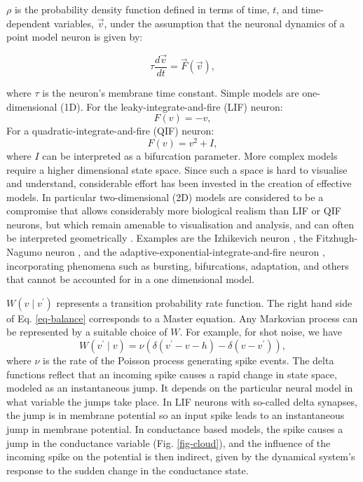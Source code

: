 \documentclass[utf8]{frontiersSCNS} %
\begin{document}
$\rho$ is the probability density function defined in terms of time, $t$, and time-dependent variables, $\vec{v}$, under the assumption that the neuronal dynamics of a point model neuron is given by:

\begin{equation}
\tau \frac{ d \vec{v}}{dt} = \vec{F}(\vec{v}), 
\end{equation}

where $\tau$ is the neuron's membrane time constant. Simple models are one-dimensional (1D). 
For the leaky-integrate-and-fire (LIF) neuron: 
\begin{equation}
F(v) = -v,
\end{equation}  
For a quadratic-integrate-and-fire (QIF) neuron:
\begin{equation}
F(v)= v^2 + I,
\end{equation}  
where $I$ can be interpreted as a bifurcation parameter. More complex models require a higher dimensional state space. Since such a space is hard to visualise and understand, considerable effort has been invested in the creation of effective models. In particular two-dimensional (2D) models are considered to be a compromise that allows considerably more biological realism than LIF or QIF neurons, but which remain amenable to visualisation and analysis, and can often be interpreted geometrically \citep{izhikevich2007dynamical}. Examples are the Izhikevich neuron \citep{izhikevich2003simple}, the Fitzhugh-Nagumo neuron \citep{fitzhugh1961impulses,nagumo1962active}, and the adaptive-exponential-integrate-and-fire neuron \citep{brette2005}, incorporating phenomena such as bursting, bifurcations, adaptation, and others that cannot be accounted for in a one dimensional model.

$W(v \mid v^{\prime})$ represents a transition probability rate function. The right hand side of Eq. \ref{eq-balance} corresponds to a Master equation. Any Markovian process can be represented by a suitable choice of $W$. For example, for shot noise, we have
\begin{equation}   
\label{master_equation}
  W(v^{\prime} \mid v) = \nu (\delta (v^{\prime} - v - h)  - \delta( v - v^{\prime})),  
\end{equation}
where $\nu$ is the rate of the Poisson process generating spike events. The delta functions reflect that an incoming spike causes a rapid change in state space, modeled as an instantaneous jump. It depends on the particular neural model in what variable the jumps take place. In LIF neurons with so-called delta synapses, the jump is in membrane potential so an input spike leads to an instantaneous jump in membrane potential. In conductance based models, the spike causes a jump in the conductance variable (Fig. \ref{fig-cloud}), and the influence of the incoming spike on the potential is then indirect, given by the dynamical system's response to the sudden change in the conductance state.
\end{document}
